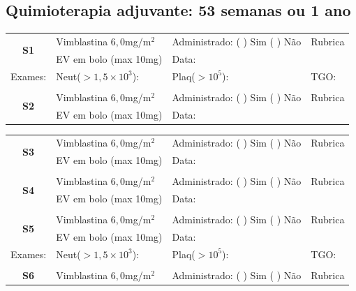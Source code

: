 \documentclass[11pt,a4paper,oldfontcommands]{memoir}
\begin{document}
\subsection{Quimioterapia adjuvante: 53 semanas ou 1 ano}
\begin{center}
\begin{table}[H]
\begin{tabular}{p{}p{}|p{}|p{3cm}}
    \hline
    \multicolumn{1}{c|}{\multirow{2}{*}{\textbf{S1}}}&{Vimblastina \(6,0\)mg/m\(^2\)}&{Administrado: (  ) Sim (  ) Não}&{Rubrica}\\
    \multicolumn{1}{c|}{}&{EV em bolo (max 10mg)}&{Data:}&\\
    \hline
    {Exames:}&{Neut(\(>1,5\times10^3\)):}&{Plaq(\(>10^5\)):}&{TGO:}
    \\
    \hline
    \\
    \hline
    \multicolumn{1}{c|}{\multirow{2}{*}{\textbf{S2}}}&{Vimblastina \(6,0\)mg/m\(^2\)}&{Administrado: (  ) Sim (  ) Não}&{Rubrica}\\
    \multicolumn{1}{c|}{}&{EV em bolo (max 10mg)}&{Data:}&\\
    \hline
\end{tabular}
\end{table}
\begin{table}[H]
\begin{tabular}{p{}p{}|p{}|p{3cm}}
    \hline
    \multicolumn{1}{c|}{\multirow{2}{*}{\textbf{S3}}}&{Vimblastina \(6,0\)mg/m\(^2\)}&{Administrado: (  ) Sim (  ) Não}&{Rubrica}\\
    \multicolumn{1}{c|}{}&{EV em bolo (max 10mg)}&{Data:}&\\
    \hline
    \\
    \hline
    \multicolumn{1}{c|}{\multirow{2}{*}{\textbf{S4}}}&{Vimblastina \(6,0\)mg/m\(^2\)}&{Administrado: (  ) Sim (  ) Não}&{Rubrica}\\
    \multicolumn{1}{c|}{}&{EV em bolo (max 10mg)}&{Data:}&\\
    \hline
    \\
    \hline
    \multicolumn{1}{c|}{\multirow{2}{*}{\textbf{S5}}}&{Vimblastina \(6,0\)mg/m\(^2\)}&{Administrado: (  ) Sim (  ) Não}&{Rubrica}\\
    \multicolumn{1}{c|}{}&{EV em bolo (max 10mg)}&{Data:}&\\
    \hline
    {Exames:}&{Neut(\(>1,5\times10^3\)):}&{Plaq(\(>10^5\)):}&{TGO:}
    \\
    \hline\\
    \hline
    \multicolumn{1}{c|}{\multirow{2}{*}{\textbf{S6}}}&{Vimblastina \(6,0\)mg/m\(^2\)}&{Administrado: (  ) Sim (  ) Não}&{Rubrica}\\

\end{tabular}
\end{table}
\end{center}
\end{document}

